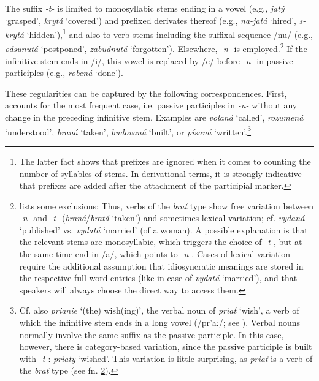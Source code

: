 \documentclass[output=paper,colorlinks,citecolor=brown,
]{langscibook}
\begin{document}
The suffix \textit{-t-} is limited to monosyllabic stems ending in a vowel (e.g., \textit{jatý} `grasped', \textit{krytá} `covered') and prefixed derivates thereof (e.g., \textit{na-jatá} `hired', \textit{s-krytá} `hidden'),\footnote{The latter fact shows that prefixes are ignored when it comes to counting the number of syllables of stems. In derivational terms, it is strongly indicative that prefixes are added after the attachment of the participial marker.} and also to verb stems including the suffixal sequence /nu/ (e.g., \textit{odsunutá} `postponed', \textit{zabudnutá} `forgotten'). Elsewhere, \textit{-n-} is employed.\footnote{\label{fn:Pass}\citet[560]{Short1993} lists some exclusions: Thus, verbs of the \textit{brať} type show free variation between \textit{-n-} and \textit{-t-} (\textit{braná}/\textit{bratá} `taken') and sometimes lexical variation; cf. \textit{vydaná} `published' vs. \textit{vydatá} `married' (of a woman). A possible explanation is that the relevant stems are monosyllabic, which triggers the choice of \textit{-t-}, but at the same time end in /a/, which points to \textit{-n-}. Cases of lexical variation require the additional assumption that idiosyncratic meanings are stored in the respective full word entries (like in case of \textit{vydatá} `married'), and that speakers will always choose the direct way to access them.} If the infinitive stem ends in /i/, this vowel is replaced by /e/ before \textit{-n-} in passive participles (e.g., \textit{robená} `done'). 

These regularities can be captured by the following correspondences. First,  accounts for the most frequent case, i.e. passive participles in \textit{-n-} without any change in the preceding infinitive stem. Examples are \textit{volaná} `called', \textit{rozumená} `understood', \textit{braná} `taken', \textit{budovaná} `built', or \textit{písaná} `written'.\footnote{Cf. also \textit{prianie} `(the) wish(ing)', the verbal noun of \textit{priať} `wish', a verb of which the infinitive stem ends in a long vowel (/pr'aː/; see ). Verbal nouns normally involve the same suffix as the passive participle. In this case, however, there is category-based variation, since the passive participle is built with \textit{-t-}: \textit{priaty} `wished'. This variation is little surprising, as \textit{priať} is a verb of the \textit{brať} type (see fn. \ref{fn:Pass}).}
\end{document}
